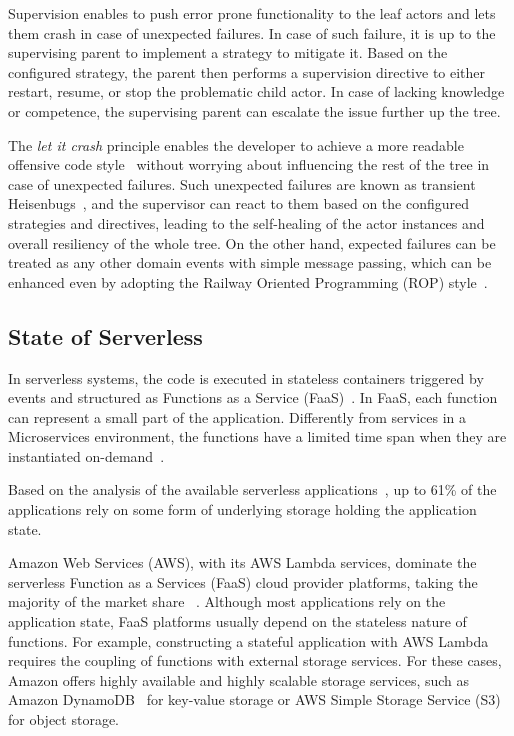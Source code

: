\documentclass[conference]{IEEEtran}
\begin{document}
Supervision enables to push error prone functionality to the leaf actors and lets them crash in case of unexpected failures. In case of such failure, it is up to the supervising parent to implement a strategy to mitigate it. Based on the configured strategy, the parent then performs a supervision directive to either restart, resume, or stop the problematic child actor. In case of lacking knowledge or competence, the supervising parent can escalate the issue further up the tree.

The \textit{let it crash} principle enables the developer to achieve a more readable offensive code style~\cite{noauthor_offensive_nodate} without worrying about influencing the rest of the tree in case of unexpected failures. Such unexpected failures are known as transient Heisenbugs~\cite{gray_why_1985}, and the supervisor can react to them based on the configured strategies and directives, leading to the self-healing of the actor instances and overall resiliency of the whole tree. On the other hand, expected failures can be treated as any other domain events with simple message passing, which can be enhanced even by adopting the Railway Oriented Programming (ROP) style~\cite{eason2018railway}.


\subsection{State of Serverless}

In serverless systems, the code is executed in stateless containers triggered by events and structured as Functions as a Service (FaaS)~\cite{taibi2020serverless}. In FaaS, each function can represent a small part of the application. Differently from services in a Microservices environment, the functions have a limited time span when they are instantiated on-demand~\cite{taibi2020serverless}.

Based on the analysis of the available serverless applications~\cite{eismann_state_2022}, up to 61\% of the applications rely on some form of underlying storage holding the application state.

Amazon Web Services (AWS), with its AWS Lambda services, dominate the serverless Function as a Services (FaaS) cloud provider platforms, taking the majority of the market share ~\cite{eismann_state_2022,noauthor_stack_nodate}. Although most applications rely on the application state, FaaS platforms usually depend on the stateless nature of functions. For example, constructing a stateful application with AWS Lambda requires the coupling of functions with external storage services. For these cases, Amazon offers highly available and highly scalable storage services, such as Amazon DynamoDB~\cite{decandia_dynamo_nodate} for key-value storage or AWS Simple Storage Service (S3) for object storage.
\end{document}
